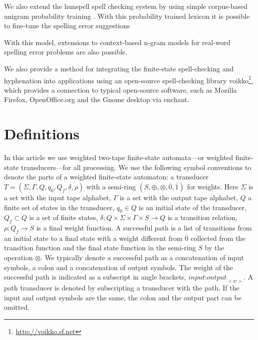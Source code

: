 \documentclass[a4paper,runningheads]{llncs}
\begin{document}
We also extend the hunspell spell checking system by using simple corpus-based
unigram probability training \cite{conf/lrec/Pirinen2010}. With this probability
trained lexicon it is possible to fine-tune the spelling error suggestions 

With this model, extensions to
context-based n-gram models for real-word spelling error problems
\cite{DBLP:conf/cicling/Wilcox-OHearnHB08} are also possible.

We also provide a method for integrating the finite-state spell-checking
and hyphenation into applications using an open-source spell-checking
library voikko\footnote{\url{http://voikko.sf.net}}, which provides a
connection to typical open-source software, such as Mozilla Firefox,
OpenOffice.org and the Gnome desktop via enchant.

\section{Definitions}
\label{sec:definitions}

In this article we use weighted two-tape finite-state automata---or
weighted finite-state transducers---for all processing. We use the
following symbol conventions to denote the parts of a weighted
finite-state automaton: a transducer $T = (\Sigma, \Gamma, Q, q_0,
Q_f, \delta, \rho)$ with a semi-ring $(S, \oplus, \otimes,
\overline{0}, \overline{1})$ for weights. Here $\Sigma$ is a set with
the input tape alphabet, $\Gamma$ is a set with the output tape
alphabet, $Q$ a finite set of states in the transducer, $q_0 \in Q$ is
an initial state of the transducer, $Q_f \subset Q$ is a set of finite
states, $\delta: Q \times \Sigma \times \Gamma \times S \rightarrow Q$
is a transition relation, $\rho: Q_f \rightarrow S$ is a final weight
function. A successful path is a list of transitions from an initial
state to a final state with a weight different from $\overline{0}$
collected from the transition function and the final state function in
the semi-ring $S$ by the operation $\otimes$. We typically denote a
successful path as a concatenation of input symbols, a colon and a
concatenation of output symbols. The weight of the successful path is
indicated as a subscript in angle brackets,
$\textit{input:output}_{<w>}$. A path transducer is denoted by
subscripting a transducer with the path.  If the input and output
symbols are the same, the colon and the output part can be omitted.
\end{document}
